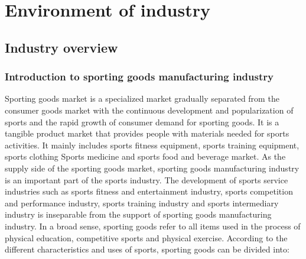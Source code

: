 \documentclass[a4paper, 12pt]{report}
\begin{document}
\chapter{Environment of industry}
\section{Industry overview}

\subsection{Introduction to sporting goods manufacturing industry}
Sporting goods market is a specialized market gradually separated from the consumer goods market with the continuous development and popularization of sports and the rapid growth of consumer demand for sporting goods. It is a tangible product market that provides people with materials needed for sports activities. It mainly includes sports fitness equipment, sports training equipment, sports clothing Sports medicine and sports food and beverage market. As the supply side of the sporting goods market, sporting goods manufacturing industry is an important part of the sports industry. The development of sports service industries such as sports fitness and entertainment industry, sports competition and performance industry, sports training industry and sports intermediary industry is inseparable from the support of sporting goods manufacturing industry.
\newline
In a broad sense, sporting goods refer to all items used in the process of physical education, competitive sports and physical exercise. According to the different characteristics and uses of sports, sporting goods can be divided into: 
\end{document}
